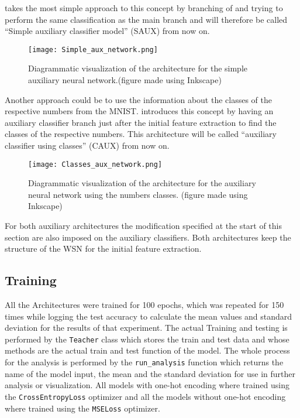 \documentclass[11pt,english]{article}
\begin{document}
	 takes the most simple approach to this concept by branching of and trying to perform the same classification as the main branch and will therefore be called ``Simple auxiliary classifier model'' (SAUX) from now on.
	
	\begin{figure}[H]
		\centering
		\texttt{[image: Simple\_aux\_network.png]}
		\caption{Diagrammatic visualization of the architecture for the simple auxiliary neural network.(figure made using Inkscape)}
		\label{fig:saux}
	\end{figure}
	
	Another approach could be to use the information about the classes of the respective numbers from the MNIST.  introduces this concept by having an auxiliary classifier branch just after the initial feature extraction to find the classes of the respective numbers. This architecture will be called ``auxiliary classifier using classes'' (CAUX) from now on.
	
	\begin{figure}[H]
		\centering
		\texttt{[image: Classes\_aux\_network.png]}
		\caption{Diagrammatic visualization of the architecture for the auxiliary neural network using the numbers classes. (figure made using Inkscape)}
		\label{fig:caux}
	\end{figure}

	For both auxiliary architectures the modification specified at the start of this section are also imposed on the auxiliary classifiers. Both architectures keep the structure of the WSN for the initial feature extraction.
	
	\subsection{Training}
	
	All the Architectures were trained for 100 epochs, which was repeated for 150 times while logging the test accuracy to calculate the mean values and standard deviation for the results of that experiment. The actual Training and testing is performed by the \lstinline|Teacher| class which stores the train and test data and whose methods are the actual train and test function of the model. The whole process for the analysis is performed by the \lstinline|run_analysis| function which returns the name of the model input, the mean and the standard deviation for use in further analysis or visualization. All models with one-hot encoding where trained using the \lstinline|CrossEntropyLoss| optimizer and all the models without one-hot encoding where trained using the \lstinline|MSELoss| optimizer.
	
\end{document}
